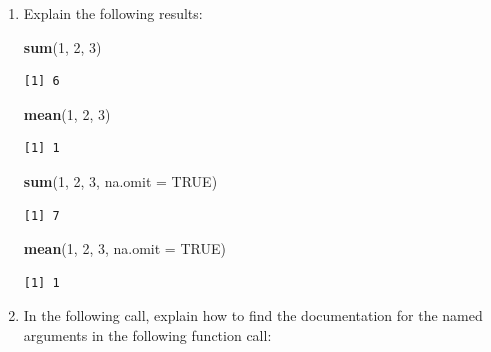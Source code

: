 \documentclass[]{book}
\newenvironment{Shaded}{\begin{snugshade}}{\end{snugshade}}
\newcommand{\DataTypeTok}[1]{\textcolor[rgb]{0.13,0.29,0.53}{#1}}
\newcommand{\DecValTok}[1]{\textcolor[rgb]{0.00,0.00,0.81}{#1}}
\newcommand{\KeywordTok}[1]{\textcolor[rgb]{0.13,0.29,0.53}{\textbf{#1}}}
\newcommand{\NormalTok}[1]{#1}
\newcommand{\OtherTok}[1]{\textcolor[rgb]{0.56,0.35,0.01}{#1}}
\theoremstyle{definition}
\theoremstyle{definition}
\theoremstyle{definition}
\theoremstyle{remark}
\begin{document}
\begin{enumerate}
\def\labelenumi{\arabic{enumi}.}
\item
  Explain the following results:

\begin{Shaded}
\begin{Highlighting}[]
\KeywordTok{sum}\NormalTok{(}\DecValTok{1}\NormalTok{, }\DecValTok{2}\NormalTok{, }\DecValTok{3}\NormalTok{)}
\end{Highlighting}
\end{Shaded}

\begin{verbatim}
[1] 6
\end{verbatim}

\begin{Shaded}
\begin{Highlighting}[]
\KeywordTok{mean}\NormalTok{(}\DecValTok{1}\NormalTok{, }\DecValTok{2}\NormalTok{, }\DecValTok{3}\NormalTok{)}
\end{Highlighting}
\end{Shaded}

\begin{verbatim}
[1] 1
\end{verbatim}

\begin{Shaded}
\begin{Highlighting}[]
\KeywordTok{sum}\NormalTok{(}\DecValTok{1}\NormalTok{, }\DecValTok{2}\NormalTok{, }\DecValTok{3}\NormalTok{, }\DataTypeTok{na.omit =} \OtherTok{TRUE}\NormalTok{)}
\end{Highlighting}
\end{Shaded}

\begin{verbatim}
[1] 7
\end{verbatim}

\begin{Shaded}
\begin{Highlighting}[]
\KeywordTok{mean}\NormalTok{(}\DecValTok{1}\NormalTok{, }\DecValTok{2}\NormalTok{, }\DecValTok{3}\NormalTok{, }\DataTypeTok{na.omit =} \OtherTok{TRUE}\NormalTok{)}
\end{Highlighting}
\end{Shaded}

\begin{verbatim}
[1] 1
\end{verbatim}
\item
  In the following call, explain how to find the documentation for the
  named arguments in the following function call:


\end{enumerate}
\end{document}
